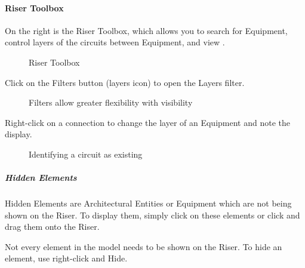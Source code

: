 \documentclass[letterpaper,10pt,english]{sphinxmanual}
\begin{document}
\paragraph{Riser Toolbox}
\label{\detokenize{docs/userguide/buildingelectricalmodel/riser/index-riser:riser-toolbox}}\label{\detokenize{docs/userguide/buildingelectricalmodel/riser/index-riser:id1}}
On the right is the Riser Toolbox, which allows you to search for Equipment, control layers of the circuits between Equipment, and view {\hyperref[\detokenize{docs/userguide/buildingelectricalmodel/riser/index-riser:hidden-elements}]{}}.

\begin{figure}[H]
\centering
\capstart

\noindent{}
\caption{Riser Toolbox}\label{\detokenize{docs/userguide/buildingelectricalmodel/riser/index-riser:id10}}\end{figure}

Click on the Filters button (layers icon) to open the Layers filter.

\begin{figure}[H]
\centering
\capstart

\noindent{}
\caption{Filters allow greater flexibility with visibility}\label{\detokenize{docs/userguide/buildingelectricalmodel/riser/index-riser:id11}}\end{figure}

Right-click on a connection to change the layer of an Equipment and note the display.

\begin{figure}[H]
\centering
\capstart

\noindent{}
\caption{Identifying a circuit as existing}\label{\detokenize{docs/userguide/buildingelectricalmodel/riser/index-riser:id12}}\end{figure}


\subparagraph{Hidden Elements}
\label{\detokenize{docs/userguide/buildingelectricalmodel/riser/index-riser:hidden-elements}}\label{\detokenize{docs/userguide/buildingelectricalmodel/riser/index-riser:id2}}
Hidden Elements are Architectural Entities or Equipment which are not being shown on the Riser.  To display them, simply click on these elements or click and drag them onto the Riser.

Not every element in the model needs to be shown on the Riser.  To hide an element, use right-click and Hide.
\end{document}
